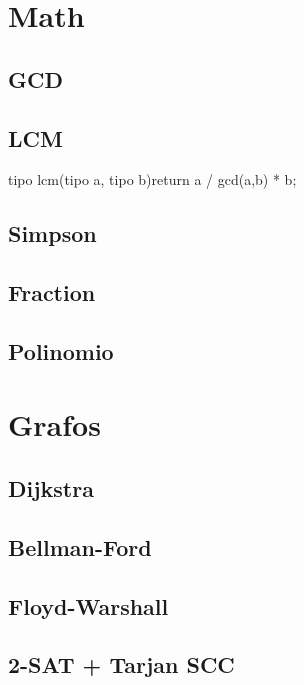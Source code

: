 \section{Math}%
\subsection{GCD}
\subsection{LCM}
\begin{code}
tipo lcm(tipo a, tipo b){return a / gcd(a,b) * b;}
\end{code}
\subsection{Simpson}
\subsection{Fraction}
\subsection{Polinomio}


\section{Grafos}%
\subsection{Dijkstra}
\subsection{Bellman-Ford}
\subsection{Floyd-Warshall}
\subsection{2-SAT + Tarjan SCC}
